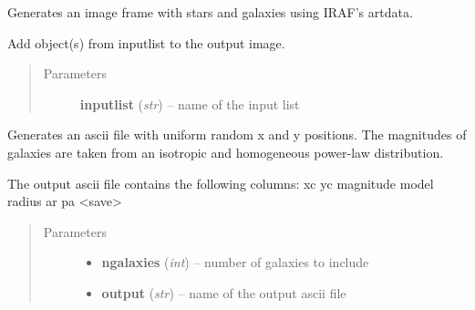 \documentclass[a4paper,11pt,english]{sphinxmanual}
\begin{document}
\begin{fulllineitems}
\label{simulator:simulator.generateGalaxies.generateFakeData}
Generates an image frame with stars and galaxies using IRAF's artdata.

\begin{fulllineitems}
\label{simulator:simulator.generateGalaxies.generateFakeData.addObjects}
Add object(s) from inputlist to the output image.
\begin{quote}\begin{description}
\item[{Parameters}] \leavevmode
\textbf{inputlist} (\emph{str}) -- name of the input list

\end{description}\end{quote}

\end{fulllineitems}


\begin{fulllineitems}
\label{simulator:simulator.generateGalaxies.generateFakeData.createGalaxylist}
Generates an ascii file with uniform random x and y positions.
The magnitudes of galaxies are taken from an isotropic and homogeneous power-law distribution.

The output ascii file contains the following columns: xc yc magnitude model radius ar pa \textless{}save\textgreater{}
\begin{quote}\begin{description}
\item[{Parameters}] \leavevmode\begin{itemize}
\item {} 
\textbf{ngalaxies} (\emph{int}) -- number of galaxies to include

\item {} 
\textbf{output} (\emph{str}) -- name of the output ascii file

\end{itemize}


\end{description}
\end{quote}
\end{fulllineitems}
\end{fulllineitems}
\end{document}
